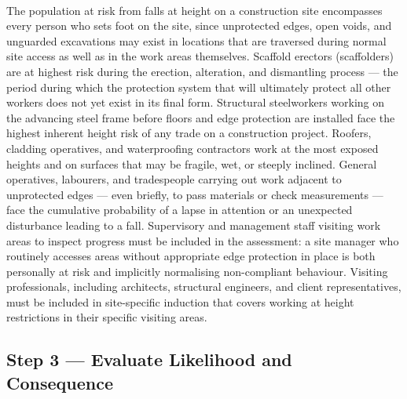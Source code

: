 \paragraph{}
The population at risk from falls at height on a construction site encompasses every person who sets foot on the site, since unprotected edges, open voids, and unguarded excavations may exist in locations that are traversed during normal site access as well as in the work areas themselves. Scaffold erectors (scaffolders) are at highest risk during the erection, alteration, and dismantling process --- the period during which the protection system that will ultimately protect all other workers does not yet exist in its final form. Structural steelworkers working on the advancing steel frame before floors and edge protection are installed face the highest inherent height risk of any trade on a construction project. Roofers, cladding operatives, and waterproofing contractors work at the most exposed heights and on surfaces that may be fragile, wet, or steeply inclined. General operatives, labourers, and tradespeople carrying out work adjacent to unprotected edges --- even briefly, to pass materials or check measurements --- face the cumulative probability of a lapse in attention or an unexpected disturbance leading to a fall. Supervisory and management staff visiting work areas to inspect progress must be included in the assessment: a site manager who routinely accesses areas without appropriate edge protection in place is both personally at risk and implicitly normalising non-compliant behaviour. Visiting professionals, including architects, structural engineers, and client representatives, must be included in site-specific induction that covers working at height restrictions in their specific visiting areas.

\subsection{Step 3 --- Evaluate Likelihood and Consequence}

